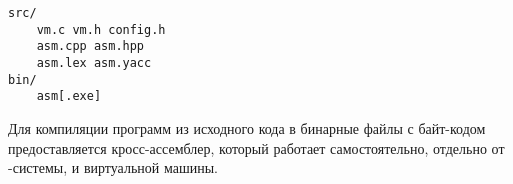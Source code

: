 \clearpage
{}\label{basm}\secdown

\begin{verbatim}
src/
    vm.c vm.h config.h
    asm.cpp asm.hpp
    asm.lex asm.yacc
bin/
    asm[.exe]
\end{verbatim}

\noindent
Для компиляции программ из исходного кода в бинарные файлы с байт-кодом
предоставляется кросс-ассемблер, который работает самостоятельно, отдельно от
\F-системы, и виртуальной машины.





\secup
